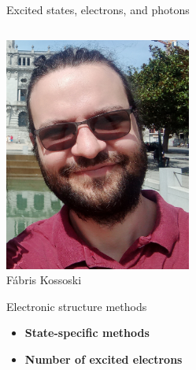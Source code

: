 \documentclass[aspectratio=169,9pt]{beamer}
\begin{document}
\begin{frame}{Excited states, electrons, and photons}

        \begin{columns}
        \begin{column}{0.33\textwidth}
        \centering
\includegraphics[width=0.46\textwidth]{fig/Fabris_2021.png}
\\
Fábris Kossoski
\\
\bigskip
        \begin{block}{Electronic structure methods}
		\bigskip
		\begin{itemize}
		\item
		{\bf State-specific methods}
		\\
		\bigskip
		\item
		{\bf Number of excited electrons}
		\end{itemize}
        \end{block}
        \end{column}


\end{columns}
\end{frame}
\end{document}
